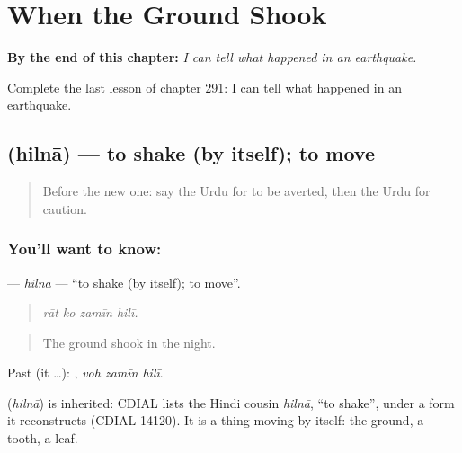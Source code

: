 
\chapter{When the Ground Shook}
\label{ch:ur-when-the-ground-shook}

\begin{chapteropening}
\textbf{By the end of this chapter:} \emph{I can tell what happened in an earthquake.}

Complete the last lesson of chapter 291: I can tell what happened in an earthquake.
\end{chapteropening}

\section[\texorpdfstring{\ur{ہلنا} (hilnā)}{ہلنا (hilnā)}]{ (hilnā) — to shake (by itself); to move}

\label{lesson:UR-C291-hilna}



\begin{quote}
Before the new one: say the Urdu for to be averted, then the Urdu for caution.
\end{quote}

\subsection*{You'll want to know: }
\textbf{} — \emph{hilnā} — \textquotedblleft{}to shake (by itself); to move\textquotedblright{}.

\begin{quote}
   
\end{quote}

\begin{quote}
\emph{rāt ko zamīn hilī.}
\end{quote}

\begin{quote}
The ground shook in the night.
\end{quote}

Past (it …):   , \emph{voh zamīn hilī}.

\begin{cousinweb}
\textbf{} (\emph{hilnā}) is inherited: CDIAL lists the Hindi cousin \emph{hilnā}, \textquotedblleft{}to shake\textquotedblright{}, under a form it reconstructs (CDIAL 14120). It is a thing moving by itself: the ground, a tooth, a leaf.
\end{cousinweb}

